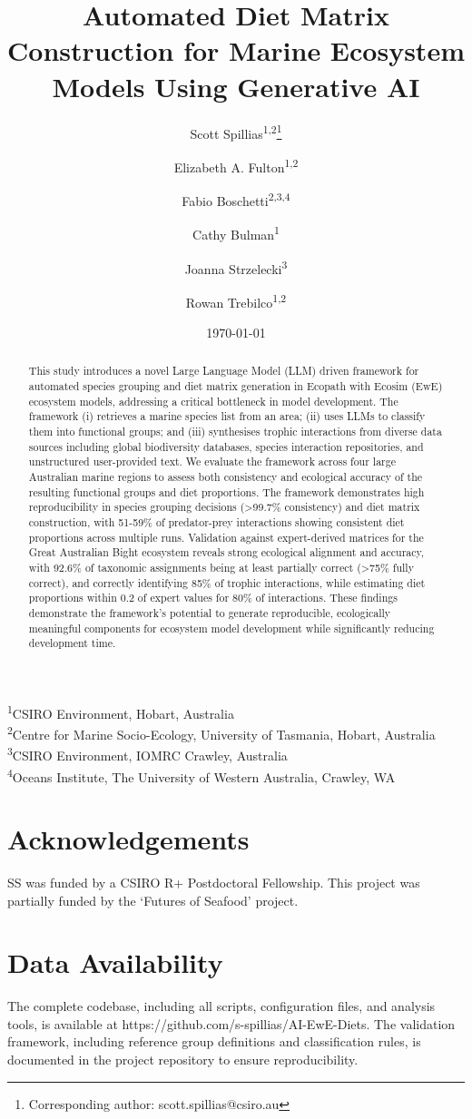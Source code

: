 \documentclass[12pt,a4paper]{article}
\title{Automated Diet Matrix Construction for Marine Ecosystem Models Using Generative AI}
\author{Scott Spillias\textsuperscript{1,2}\thanks{Corresponding author: scott.spillias@csiro.au} \and
Elizabeth A. Fulton\textsuperscript{1,2} \and
Fabio Boschetti\textsuperscript{2,3,4} \and
Cathy Bulman\textsuperscript{1} \and
Joanna Strzelecki\textsuperscript{3} \and
Rowan Trebilco\textsuperscript{1,2}}
\date{\today}  %
\newcommand{\affiliations}{
\noindent\textsuperscript{1}CSIRO Environment, Hobart, Australia\\
\textsuperscript{2}Centre for Marine Socio-Ecology, University of Tasmania, Hobart, Australia\\
\textsuperscript{3}CSIRO Environment, IOMRC Crawley, Australia\\
\textsuperscript{4}Oceans Institute, The University of Western Australia, Crawley, WA\\
}
\begin{document}
\maketitle
\affiliations

\begin{abstract}
This study introduces a novel Large Language Model (LLM) driven framework for automated species grouping and diet matrix generation in Ecopath with Ecosim (EwE) ecosystem models, addressing a critical bottleneck in model development. The framework (i) retrieves a marine species list from an area; (ii) uses LLMs to classify them into functional groups; and (iii) synthesises trophic interactions from diverse data sources including global biodiversity databases, species interaction repositories, and unstructured user-provided text. We evaluate the framework across four large Australian marine regions to assess both consistency and ecological accuracy of the resulting functional groups and diet proportions. The framework demonstrates high reproducibility in species grouping decisions (>99.7\% consistency) and diet matrix construction, with 51-59\% of predator-prey interactions showing consistent diet proportions across multiple runs. Validation against expert-derived matrices for the Great Australian Bight ecosystem reveals strong ecological alignment and accuracy, with 92.6\% of taxonomic assignments being at least partially correct (>75\% fully correct), and correctly identifying 85\% of trophic interactions, while estimating diet proportions within 0.2 of expert values for 80\% of interactions. These findings demonstrate the framework's potential to generate reproducible, ecologically meaningful components for ecosystem model development while significantly reducing development time.
\end{abstract}






\section*{Acknowledgements}
SS was funded by a CSIRO R+ Postdoctoral Fellowship. This project was partially funded by the `Futures of Seafood' project.

\section*{Data Availability}
The complete codebase, including all scripts, configuration files, and analysis tools, is available at https://github.com/s-spillias/AI-EwE-Diets. The validation framework, including reference group definitions and classification rules, is documented in the project repository to ensure reproducibility.
\end{document}
